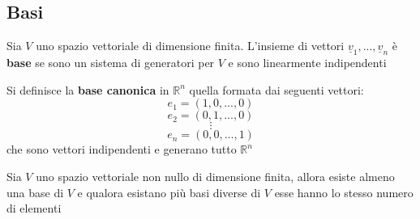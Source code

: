 \documentclass[a4paper,12pt, oneside]{book}
\begin{document}
\subsection{Basi}
\begin{definizione}
	Sia $V$ uno spazio vettoriale di dimensione finita. L'insieme di vettori $\underline{v}_1,...,\underline{v}_n$ è \textbf{base} se sono un sistema di generatori per $V$ e sono linearmente indipendenti
\end{definizione}
\begin{nota}
	Si definisce la \textbf{base canonica} in $\mathbb{R}^n$ quella formata dai seguenti vettori:
	$$e_1=(1,0,...,0)$$
	$$e_2=(0,1,...,0)$$
	$$\vdots$$
	$$e_n=(0,0,...,1)$$
	che sono vettori indipendenti e generano tutto $\mathbb{R}^n$
\end{nota}
\newpage
\begin{teorema}
	Sia $V$ uno spazio vettoriale non nullo di dimensione finita, allora esiste almeno una base di $V$ e qualora esistano più basi diverse di $V$ esse hanno lo stesso numero di elementi
\end{teorema}
\end{document}
